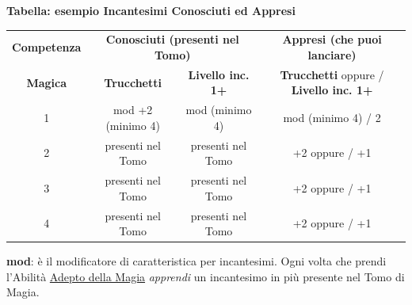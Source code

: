\textbf{Tabella: esempio Incantesimi Conosciuti ed Appresi}

\medskip

\begin{tabular}{|c|c|c|c|}
\hline
\textbf{Competenza} & \multicolumn{2}{c|}{\textbf{Conosciuti (presenti nel Tomo)}} & \multicolumn{1}{c|}{\textbf{Appresi (che puoi lanciare)}} \\
\cline{2-4}
\textbf{Magica} & \textbf{Trucchetti} & \textbf{Livello inc. 1+} & \multicolumn{1}{c|}{\textbf{Trucchetti} oppure /  \textbf{Livello inc. 1+}} \\
\hline
1 & mod +2 (minimo 4) & mod (minimo 4) & mod (minimo 4) / 2 \\
\hline
2 & presenti nel Tomo & presenti nel Tomo & +2 oppure / +1 \\
\hline
3 & presenti nel Tomo & presenti nel Tomo & +2 oppure / +1 \\
\hline
4 & presenti nel Tomo & presenti nel Tomo & +2 oppure / +1 \\
\hline 
\end{tabular}


\medskip

\textbf{mod}: è il modificatore di caratteristica per incantesimi. Ogni volta che prendi l'Abilità \hyperlink{adeptodellamagia}{Adepto della Magia} \emph{apprendi} un incantesimo in più presente nel Tomo di Magia.

